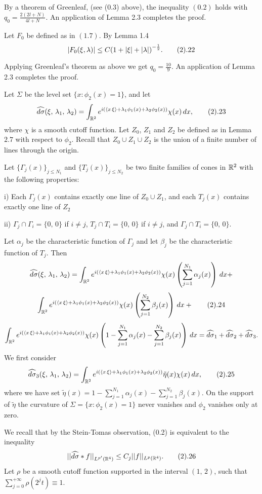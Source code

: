 By a theorem of Greenleaf, (see (0.3) above), 
the inequality $(0.2)$ holds with $q_0=\frac{2(2l+N)}{4l+N}$. 
An application of Lemma 2.3 completes the proof. 
\enddemo 

 Let $F_0$ be defined as in $(1.7)$. By Lemma 1.4 
$$ |F_{0}(\xi,\lambda)| \leq C{(1+|\xi|+|\lambda|)}^{-\frac{1}{2}}. \tag2.22$$ 

Applying Greenleaf's theorem as above we get 
$q_0=\frac{10}{9}$. An application of Lemma 2.3 completes the proof. 
\enddemo 

 Let $\Sigma$ be the level set 
$\{x:\phi_2(x)=1\}$, and let
$$
\widehat{d\sigma}(\xi,\,\lambda_1,\,\lambda_2) =
\int_{{\Bbb R}^2} e^{i(
\langle x\,\xi\rangle+\lambda_1\phi_1(x)+\lambda_2\phi_2(x))}
\chi(x)\,dx,
\tag 2.23
$$
where $\chi$ is a smooth cutoff function.
Let  $Z_0$, $Z_1$ and $Z_2$  be defined as in Lemma $2.7$ with respect to 
$\phi_2$. 
Recall that $Z_0\cup Z_1\cup Z_2$ is the union of a finite number of 
lines through the origin.
\par
Let $\{\Gamma_j(x)\}_{j\leq N_1}$ and 
$\{T_j(x)\}_{j\leq N_2}$ be  two finite families of cones in ${\Bbb R}^2$ 
with the following properties:
\item {i)}
Each $\Gamma_j(x)$  contains exactly one line of  
$Z_0\cup Z_1$, and each  $T_j(x)$  contains exactly one line of  
$Z_2$
\item{ii)}
$\Gamma_j \cap \Gamma_i =\{0,\,0\}$ if $i\ne j$,
$T_j \cap T_i =\{0,\,0\}$ if $i\ne j$,
and $\Gamma_j \cap T_i =\{0,\,0\}$.
\par
Let $\alpha_j $ be the characteristic function  of $\Gamma_j$ and let 
$\beta_j$ be the characteristic function of $T_j$.
Then
$$
\widehat{d\sigma}(\xi,\,\lambda_1,\,\lambda_2) =
\int_{{\Bbb R}^2} e^{i(
\langle x\,\xi\rangle+\lambda_1\phi_1(x)+\lambda_2\phi_2(x))}
\chi(x) \left( \sum_{j=1}^{N_1}
\alpha_j(x)\right) \,dx + 
$$
$$
\int_{{\Bbb R}^2} e^{i(
\langle x\,\xi\rangle+\lambda_1\phi_1(x)+\lambda_2\phi_2(x))}
\chi(x) \left(\sum_{j=1}^{N_2}
\beta_j(x)\right) \,dx 
+ 
\tag 2.24
$$
$$
\int_{{\Bbb R}^2} e^{i(
\langle x\,\xi\rangle+\lambda_1\phi_1(x)+\lambda_2\phi_2(x))}\chi(x) 
\left(1-\sum_{j=1}^{N_1}\alpha_j(x)-\sum_{j=1}^{N_2}\beta_j(x)\right)\,dx
= \widehat{d\sigma}_1 + \widehat{d\sigma}_2 + \widehat{d\sigma}_3.
$$
We first consider 
$$
\widehat{d\sigma}_3(\xi,\,\lambda_1,\,\lambda_2) =
\int_{{\Bbb R}^2} e^{i(
\langle x\,\xi\rangle+\lambda_1\phi_1(x)+\lambda_2\phi_2(x))}
\tilde\eta(x)\chi(x)  \,dx,
\tag 2.25
$$
where we have set 
$\tilde\eta(x)= 1-\sum_{j=1}^{N_1}\alpha_j(x)-\sum_{j=1}^{N_2}\beta_j(x)$. On the support of $\tilde\eta$  the curvature of $\Sigma=\{x: \phi_2(x) =1\}$  
never vanishes and $\phi_2$ vanishes only at zero. 
\par
We recall that by the Stein-Tomas observation, (0.2) is equivalent to  the 
inequality
$$
||  \widehat{d\sigma}*f||_{L^{p'}({\Bbb R}^{4})}
\leq C_j||f||_{L^p({\Bbb R}^{4})}.
\tag 2.26
$$ 
Let $\rho$ be a smooth cutoff function supported in the 
interval $(1,\,2)$, such that $\sum_{j=0}^{+\infty} \rho(2^jt) \equiv 1$. 

